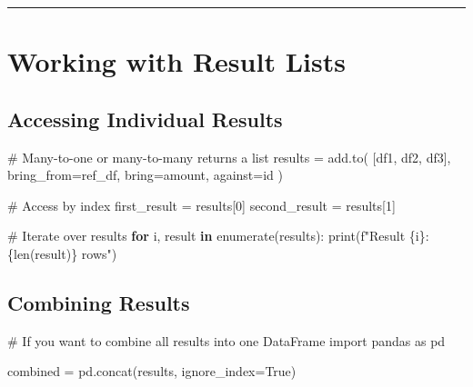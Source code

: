 \documentclass[
  letterpaper,
]{scrbook}
\newenvironment{Shaded}{\begin{snugshade}}{\end{snugshade}}
\newcommand{\BuiltInTok}[1]{\textcolor[rgb]{0.00,0.23,0.31}{#1}}
\newcommand{\CommentTok}[1]{\textcolor[rgb]{0.37,0.37,0.37}{#1}}
\newcommand{\ControlFlowTok}[1]{\textcolor[rgb]{0.00,0.23,0.31}{\textbf{#1}}}
\newcommand{\DecValTok}[1]{\textcolor[rgb]{0.68,0.00,0.00}{#1}}
\newcommand{\ImportTok}[1]{\textcolor[rgb]{0.00,0.46,0.62}{#1}}
\newcommand{\KeywordTok}[1]{\textcolor[rgb]{0.00,0.23,0.31}{\textbf{#1}}}
\newcommand{\NormalTok}[1]{\textcolor[rgb]{0.00,0.23,0.31}{#1}}
\newcommand{\OperatorTok}[1]{\textcolor[rgb]{0.37,0.37,0.37}{#1}}
\newcommand{\SpecialCharTok}[1]{\textcolor[rgb]{0.37,0.37,0.37}{#1}}
\newcommand{\SpecialStringTok}[1]{\textcolor[rgb]{0.13,0.47,0.30}{#1}}
\newcommand{\StringTok}[1]{\textcolor[rgb]{0.13,0.47,0.30}{#1}}
\newcommand{\VariableTok}[1]{\textcolor[rgb]{0.07,0.07,0.07}{#1}}
\begin{document}
\begin{center}\rule{0.5\linewidth}{0.5pt}\end{center}

\section{Working with Result Lists}\label{working-with-result-lists}

\subsection{Accessing Individual
Results}\label{accessing-individual-results}

\begin{Shaded}
\begin{Highlighting}[]
\CommentTok{\# Many{-}to{-}one or many{-}to{-}many returns a list}
\NormalTok{results }\OperatorTok{=}\NormalTok{ add.to(}
\NormalTok{    [df1, df2, df3],}
\NormalTok{    bring\_from}\OperatorTok{=}\NormalTok{ref\_df,}
\NormalTok{    bring}\OperatorTok{=}\StringTok{\textquotesingle{}amount\textquotesingle{}}\NormalTok{,}
\NormalTok{    against}\OperatorTok{=}\StringTok{\textquotesingle{}id\textquotesingle{}}
\NormalTok{)}

\CommentTok{\# Access by index}
\NormalTok{first\_result }\OperatorTok{=}\NormalTok{ results[}\DecValTok{0}\NormalTok{]}
\NormalTok{second\_result }\OperatorTok{=}\NormalTok{ results[}\DecValTok{1}\NormalTok{]}

\CommentTok{\# Iterate over results}
\ControlFlowTok{for}\NormalTok{ i, result }\KeywordTok{in} \BuiltInTok{enumerate}\NormalTok{(results):}
    \BuiltInTok{print}\NormalTok{(}\SpecialStringTok{f"Result }\SpecialCharTok{\{}\NormalTok{i}\SpecialCharTok{\}}\SpecialStringTok{: }\SpecialCharTok{\{}\BuiltInTok{len}\NormalTok{(result)}\SpecialCharTok{\}}\SpecialStringTok{ rows"}\NormalTok{)}
\end{Highlighting}
\end{Shaded}

\subsection{Combining Results}\label{combining-results}

\begin{Shaded}
\begin{Highlighting}[]
\CommentTok{\# If you want to combine all results into one DataFrame}
\ImportTok{import}\NormalTok{ pandas }\ImportTok{as}\NormalTok{ pd}

\NormalTok{combined }\OperatorTok{=}\NormalTok{ pd.concat(results, ignore\_index}\OperatorTok{=}\VariableTok{True}\NormalTok{)}
\end{Highlighting}
\end{Shaded}
\end{document}
